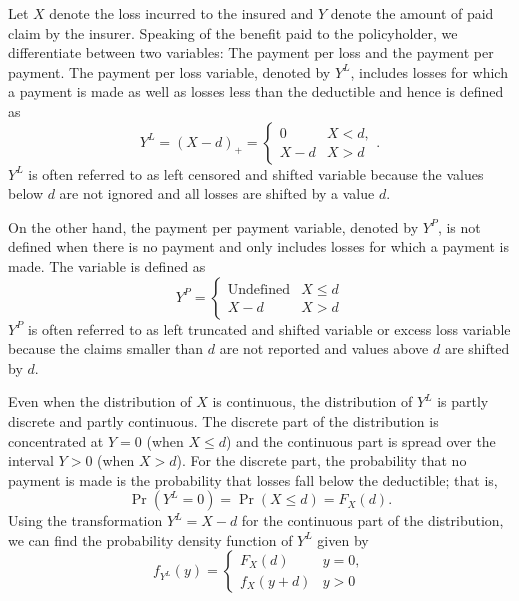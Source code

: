 \documentclass[]{book}
\theoremstyle{definition}
\theoremstyle{definition}
\theoremstyle{definition}
\theoremstyle{remark}
\begin{document}
Let \(X\) denote the loss incurred to the insured and \(Y\) denote the
amount of paid claim by the insurer. Speaking of the benefit paid to the
policyholder, we differentiate between two variables: The payment per
loss and the payment per payment. The payment per loss variable, denoted
by \(Y^{L}\), includes losses for which a payment is made as well as
losses less than the deductible and hence is defined as
\[Y^{L} = \left( X - d \right)_{+} 
= \left\{ \begin{array}{cc}
0 & X < d, \\
X - d & X > d  
\end{array} \right. .\] \(Y^{L}\) is often referred to as left censored
and shifted variable because the values below \(d\) are not ignored and
all losses are shifted by a value \(d\).

On the other hand, the payment per payment variable, denoted by
\(Y^{P}\), is not defined when there is no payment and only includes
losses for which a payment is made. The variable is defined as
\[Y^{P} = \left\{ \begin{matrix}
\text{Undefined} & X \le d \\
X - d & X > d 
\end{matrix} \right. \] \(Y^{P}\) is often referred to as left truncated
and shifted variable or excess loss variable because the claims smaller
than \(d\) are not reported and values above \(d\) are shifted by \(d\).

Even when the distribution of \(X\) is continuous, the distribution of
\(Y^{L}\) is partly discrete and partly continuous. The discrete part of
the distribution is concentrated at \(Y = 0\) (when \(X \leq d\)) and
the continuous part is spread over the interval \(Y > 0\) (when
\(X > d\)). For the discrete part, the probability that no payment is
made is the probability that losses fall below the deductible; that is,
\[\Pr\left( Y^{L} = 0 \right) = \Pr\left( X \leq d \right) = F_{X}\left( d \right).\]
Using the transformation \(Y^{L} = X - d\) for the continuous part of
the distribution, we can find the probability density function of
\(Y^{L}\) given by \[f_{Y^{L}}\left( y \right) = \left\{ \begin{matrix}
F_{X}\left( d \right) & y = 0, \\
f_{X}\left( y + d \right) & y > 0 
\end{matrix} \right. \]
\end{document}

